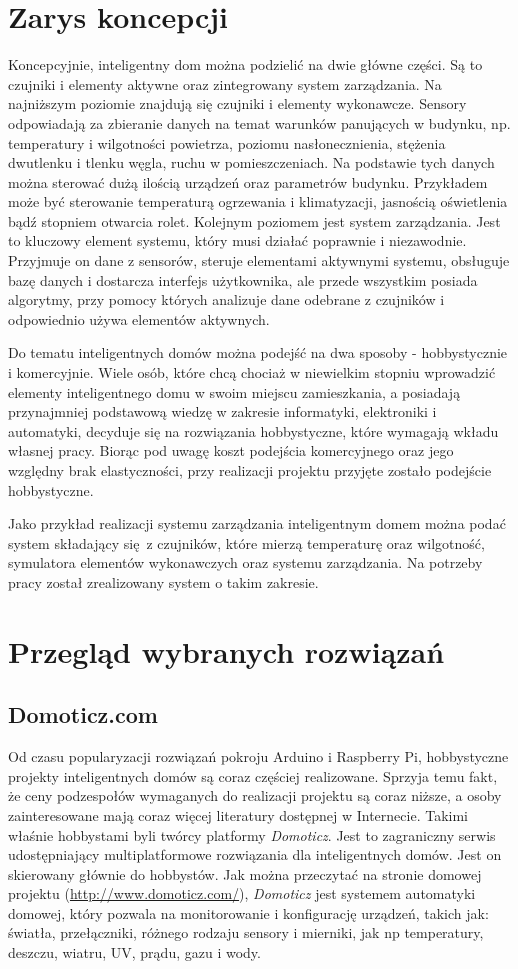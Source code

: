\documentclass[eng,oneside]{mgr}
\begin{document}
\section{Zarys koncepcji}
Koncepcyjnie, inteligentny dom można podzielić na dwie główne części. Są to czujniki i elementy aktywne oraz zintegrowany system zarządzania. Na najniższym poziomie znajdują się czujniki i elementy wykonawcze. Sensory odpowiadają za zbieranie danych na temat warunków panujących w budynku, np. temperatury i wilgotności powietrza, poziomu nasłonecznienia, stężenia dwutlenku i tlenku węgla, ruchu w pomieszczeniach. Na podstawie tych danych można sterować dużą ilością urządzeń oraz parametrów budynku. Przykładem może być sterowanie temperaturą ogrzewania i klimatyzacji, jasnością oświetlenia bądź stopniem otwarcia rolet. Kolejnym poziomem jest system zarządzania. Jest to kluczowy element systemu, który musi działać poprawnie i niezawodnie. Przyjmuje on dane z sensorów, steruje elementami aktywnymi systemu, obsługuje bazę danych i dostarcza interfejs użytkownika, ale przede wszystkim posiada algorytmy, przy pomocy których analizuje dane odebrane z czujników i odpowiednio używa elementów aktywnych.

Do tematu inteligentnych domów można podejść na dwa sposoby - hobbystycznie i komercyjnie. Wiele osób, które chcą chociaż w niewielkim stopniu wprowadzić elementy inteligentnego domu w swoim miejscu zamieszkania, a posiadają przynajmniej podstawową wiedzę w zakresie informatyki, elektroniki i automatyki, decyduje się na rozwiązania hobbystyczne, które wymagają wkładu własnej pracy. Biorąc pod uwagę koszt podejścia komercyjnego oraz jego względny brak elastyczności, przy realizacji projektu przyjęte zostało podejście hobbystyczne.

Jako przykład realizacji systemu zarządzania inteligentnym domem można podać system składający się z czujników, które mierzą temperaturę oraz wilgotność, symulatora elementów wykonawczych oraz systemu zarządzania. Na potrzeby pracy został zrealizowany system o takim zakresie.

\section{Przegląd wybranych rozwiązań}
\subsection{Domoticz.com}
Od czasu popularyzacji rozwiązań pokroju Arduino i Raspberry Pi, hobbystyczne projekty inteligentnych domów są coraz częściej realizowane. Sprzyja temu fakt, że ceny podzespołów wymaganych do realizacji projektu są coraz niższe, a osoby zainteresowane mają coraz więcej literatury dostępnej w Internecie. Takimi właśnie hobbystami byli twórcy platformy \textit{Domoticz}. Jest to zagraniczny serwis udostępniający multiplatformowe rozwiązania dla inteligentnych domów. Jest on skierowany głównie do hobbystów. Jak można przeczytać na stronie domowej projektu (\url{http://www.domoticz.com/}), \textit{Domoticz} jest systemem automatyki domowej, który pozwala na monitorowanie i konfigurację urządzeń, takich jak: światła, przełączniki, różnego rodzaju sensory i mierniki, jak np temperatury, deszczu, wiatru, UV, prądu, gazu i wody.
\end{document}
